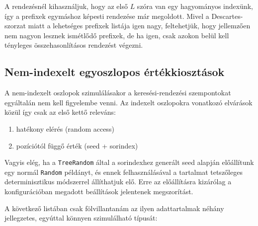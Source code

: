 \documentclass[
    parspace,
    noindent,
    nohyp,
]{elteiktdk}[2023/04/10]
\begin{document}
A rendezésnél kihasználjuk, hogy az első $L$ szóra van egy hagyományos indexünk,
így a prefixek egymáshoz képesti rendezése már megoldott.
Mivel a Descartes-szorzat miatt a lehetséges prefixek listája igen nagy,
feltehetjük, hogy jellemzően nem nagyon lesznek ismétlődő prefixek,
de ha igen, csak azokon belül kell tényleges összehasonlításos rendezést végezni.

\subsection{Nem-indexelt egyoszlopos értékkiosztások}

A nem-indexelt oszlopok szimulálásakor a keresési-rendezési szempontokat egyáltalán nem kell figyelembe venni.
Az indexelt oszlopokra vonatkozó elvárások közül így csak az első kettő releváns:

\begin{enumerate}
  \item hatékony elérés (random access)
  \item pozíciótól függő érték (seed + sorindex)
\end{enumerate}

Vagyis elég, ha a \texttt{TreeRandom} által a sorindexhez generált seed alapján
előállítunk egy normál \texttt{Random} példányt,
és ennek felhasználásával a tartalmat tetszőleges determinisztikus módszerrel állíthatjuk elő.
Erre az előállításra kizárólag a konfigurációban megadott beállítások jelentenek megszorítást.

A következő listában csak fölvillantanám az ilyen adattartalmak néhány jellegzetes,
egyúttal könnyen szimulálható típusát:
\end{document}
